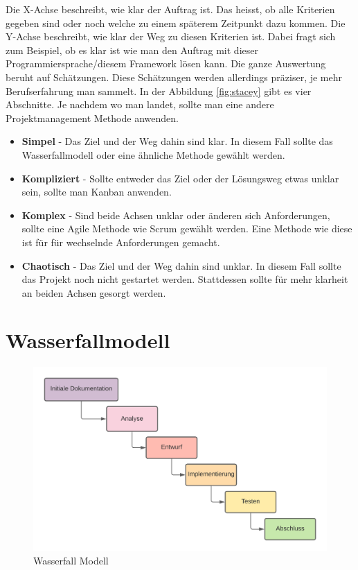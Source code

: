 Die X-Achse beschreibt, wie klar der Auftrag ist. Das heisst, ob alle Kriterien gegeben sind oder noch welche zu einem späterem Zeitpunkt dazu kommen. Die Y-Achse beschreibt, wie klar der Weg zu diesen Kriterien ist. Dabei fragt sich zum Beispiel, ob es klar ist wie man den Auftrag mit dieser Programmiersprache/diesem Framework lösen kann.
\newline
Die ganze Auswertung beruht auf Schätzungen. Diese Schätzungen werden allerdings präziser, je mehr Berufserfahrung man sammelt.
\newline
In der Abbildung \ref*{fig:stacey} gibt es vier Abschnitte. Je nachdem wo man landet, sollte man eine andere Projektmanagement Methode anwenden.
\newpage
\begin{itemize}
  \item \textbf{Simpel} - Das Ziel und der Weg dahin sind klar. In diesem Fall sollte das Wasserfallmodell oder eine ähnliche Methode gewählt werden.
  \item \textbf{Kompliziert} - Sollte entweder das Ziel oder der Lösungsweg etwas unklar sein, sollte man Kanban anwenden.
  \item \textbf{Komplex} - Sind beide Achsen unklar oder änderen sich Anforderungen, sollte eine Agile Methode wie Scrum gewählt werden. Eine Methode wie diese ist für für wechselnde Anforderungen gemacht.
  \item \textbf{Chaotisch} - Das Ziel und der Weg dahin sind unklar. In diesem Fall sollte das Projekt noch nicht gestartet werden. Stattdessen sollte für mehr klarheit an beiden Achsen gesorgt werden. 
\end{itemize}

\section{Wasserfallmodell}

\begin{figure}[!ht]
  \centering
  \includegraphics[width=.95\linewidth]{./images/OSEDashboard_Wasserfall.png}
  \caption[Ein von mir mit Lucidchart erstelltes Wasserfallmodell]{Wasserfall Modell}
  \label{fig:wasserfall}
\end{figure}

